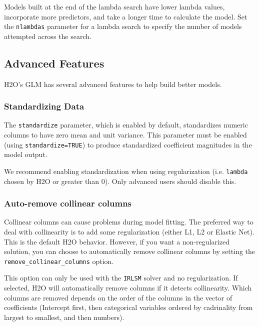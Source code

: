 Models built at the end of the lambda search have
lower lambda values, incorporate more predictors, and take a longer time to calculate the model. Set the \texttt{nlambdas} parameter for a lambda search to specify the number of models attempted across the search.

\waterExampleInR


\waterExampleInPython



\subsection{Advanced Features}

H2O's GLM has several advanced features to help build better models.
\subsubsection{Standardizing Data}

The \texttt{standardize} parameter, which is enabled by default, standardizes numeric columns to have zero mean and
unit variance.  This parameter must be enabled (using \texttt{standardize=TRUE}) to produce standardized coefficient magnitudes in the model output.

We recommend enabling standardization when using regularization (i.e. \texttt{lambda} chosen by H2O or greater than 0). Only advanced users should disable this.

\subsubsection{Auto-remove collinear columns}
Collinear columns can cause problems during model fitting. The preferred way to deal with collinearity is to add some
regularization (either L1, L2 or Elastic Net). This is the default H2O behavior. However, if you want a non-regularized
solution, you can choose to automatically remove collinear columns by setting the \texttt{remove\_collinear\_columns}
option.

This option can only be used with the \texttt{IRLSM} solver and no regularization. If selected, H2O will automatically
remove columns if it detects collinearity. Which columns are removed depends on the order of the columns in the vector
of coefficients (Intercept first, then categorical variables ordered by cadrinality from largest to smallest, and then
numbers).

